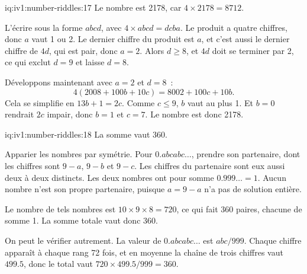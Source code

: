 \begin{solution}{iq:iv1:number-riddles:17}
Le nombre est 2178, car $4 \times 2178 = 8712$.

L'écrire sous la forme $abcd$, avec $4 \times abcd = dcba$. Le produit a quatre chiffres, donc $a$ vaut 1 ou 2. Le dernier chiffre du produit est $a$, et c'est aussi le dernier chiffre de $4d$, qui est pair, donc $a = 2$. Alors $d \geq 8$, et $4d$ doit se terminer par 2, ce qui exclut $d = 9$ et laisse $d = 8$.

Développons maintenant avec $a = 2$ et $d = 8$~:
\[
4(2008 + 100b + 10c) = 8002 + 100c + 10b.
\]
Cela se simplifie en $13b + 1 = 2c$. Comme $c \leq 9$, $b$ vaut au plus 1. Et $b = 0$ rendrait $2c$ impair, donc $b = 1$ et $c = 7$. Le nombre est donc 2178.

\end{solution}

\begin{solution}{iq:iv1:number-riddles:18}
La somme vaut 360.

Apparier les nombres par symétrie. Pour $0.abcabc\dots$, prendre son partenaire, dont les chiffres sont $9 - a$, $9 - b$ et $9 - c$. Les chiffres du partenaire sont eux aussi deux à deux distincts. Les deux nombres ont pour somme $0.999\dots = 1$. Aucun nombre n'est son propre partenaire, puisque $a = 9 - a$ n'a pas de solution entière.

Le nombre de tels nombres est $10 \times 9 \times 8 = 720$, ce qui fait 360 paires, chacune de somme 1. La somme totale vaut donc 360.

On peut le vérifier autrement. La valeur de $0.abcabc\dots$ est $abc/999$. Chaque chiffre apparaît à chaque rang 72 fois, et en moyenne la chaîne de trois chiffres vaut $499.5$, donc le total vaut $720 \times 499.5 / 999 = 360$.

\end{solution}

